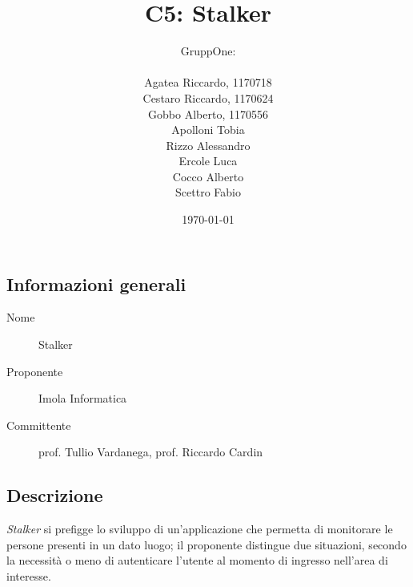 \documentclass[../studio-di-fattibilita.tex]{subfiles}
\title{C5: Stalker}
\author{GruppOne:\\\\Agatea Riccardo, 1170718\\Cestaro Riccardo, 1170624\\Gobbo Alberto, 1170556\\Apolloni Tobia\\Rizzo Alessandro\\Ercole Luca\\Cocco Alberto\\Scettro Fabio}
\date{\today}
\begin{document}
	\subsection{Informazioni generali}
	\label{sec:informazioni_generali}
	\begin{description}
		\item[Nome] Stalker
		\item[Proponente] Imola Informatica
		\item[Committente] prof. Tullio Vardanega, prof. Riccardo Cardin
	\end{description}
	\subsection{Descrizione}
	\label{sec:descrizione}
	\textit{Stalker} si prefigge lo sviluppo di un'applicazione che permetta di monitorare le persone presenti in un dato luogo; il proponente distingue due situazioni, secondo la necessità o meno di autenticare l'utente al momento di ingresso nell'area di interesse.
\end{document}
